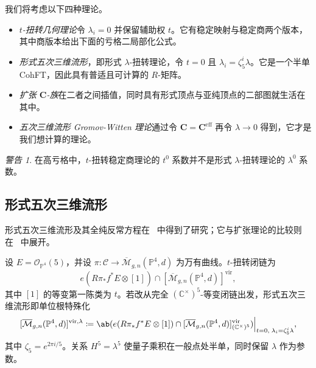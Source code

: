 \documentclass{amsart}
\theoremstyle{definition}
\theoremstyle{remark}
\newtheorem{warn}[thm]{警告}
\theoremstyle{plain}
\theoremstyle{definition}
\theoremstyle{remark}
\newcommand{\C}{\mathbb{C}}
\renewcommand{\P}{\mathbb{P}}
\newcommand{\Mbar}{\overline{\mathcal{M}}}
\newcommand{\mc}[1]{\mathcal{#1}}
\newcommand{\mbf}[1]{\mathbf{#1}}
\newcommand{\mr}[1]{\mathrm{#1}}
\newcommand{\1}{\mathbf{1}}
\newcommand{\2}{\mathbf{2}}
\newcommand{\3}{\mathbf{3}}
\newcommand{\vir}{\mr{vir}}
\begin{document}
我们将考虑以下四种理论。
\begin{itemize}
    \item \textit{\(t\)-扭转几何理论}令 \(\lambda_i = 0\) 并保留辅助权 \(t\)。它有稳定映射与稳定商两个版本，其中商版本给出下面的亏格二局部化公式。
    \item \textit{形式五次三维流形}，即形式 \(\lambda\)-扭转理论，令 \(t = 0\) 且 \(\lambda_i = \zeta_5^i \lambda\)。它是一个半单 CohFT，因此具有普适且可计算的 \(R\)-矩阵。
    \item \textit{扩张 \(\mbf{C}\)-族}在二者之间插值，同时具有形式顶点与亚纯顶点的二部图就生活在其中。
    \item \textit{五次三维流形 Gromov-Witten 理论}通过令 \(\mbf{C} = \mbf{C}^{\mr{eff}}\) 再令 \(\lambda \to 0\) 得到，它才是我们想计算的理论。
\end{itemize}

\begin{warn}
    在高亏格中，\(t\)-扭转稳定商理论的 \(t^0\) 系数并不是形式 \(\lambda\)-扭转理论的 \(\lambda^0\) 系数。
\end{warn}

\subsection{形式五次三维流形}%
\label{sub:The formal quintic}

形式五次三维流形及其全纯反常方程在~\cite{LhoPandharipande2019} 中得到了研究；它与扩张理论的比较则在~\cite{GJRstructure} 中展开。

设 \(E = \mc{O}_{\P^4}(5)\)，并设 \(\pi \colon \mc{C} \to \Mbar_{g,n}(\P^4,d)\) 为万有曲线。\(t\)-扭转闭链为
\[ e(R\pi_* f^* E \otimes [1]) \cap [\Mbar_{g,n}(\P^4,d)]^{\vir}, \]
其中 \([1]\) 的等变第一陈类为 \(t\)。若改从完全 \((\C^{\times})^5\)-等变闭链出发，形式五次三维流形即单位根特殊化
\[ [\Mbar_{g,n}(\P^4,d)]^{\vir,\lambda} \coloneqq \ab( e(R\pi_*f^*E \otimes [1]) \cap [\Mbar_{g,n}(\P^4,d)]^{\vir}_{(\C^{\times})^5})\Big|_{t=0, \; \lambda_i = \zeta_5^i \lambda}, \]
其中 \(\zeta_5 = e^{2\pi i/5}\)。关系 \(H^5 = \lambda^5\) 使量子乘积在一般点处半单，同时保留 \(\lambda\) 作为参数。
\end{document}
